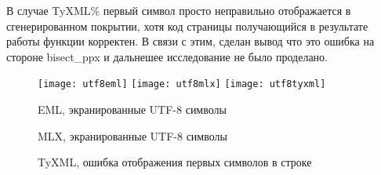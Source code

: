В случае TyXML\% первый символ просто неправильно отображается в сгенерированном покрытии, хотя код страницы получающийся в результате работы функции корректен.
В связи с этим, сделан вывод что это ошибка на стороне bisect\_ppx и дальнешее исследование не было проделано.

\begin{figure}[ht!]
    \texttt{[image: utf8eml]}\hfill
    \texttt{[image: utf8mlx]}\hfill
    \texttt{[image: utf8tyxml]}
    \caption{EML, экранированные UTF-8 символы}
    \caption{MLX, экранированные UTF-8 символы}
    \caption{TyXML, ошибка отображения первых символов в строке}
    \label{fig:utf8}
\end{figure}
